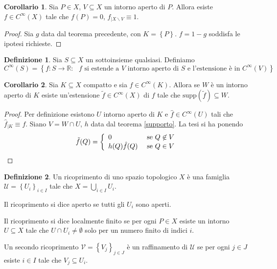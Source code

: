 \documentclass[a4paper,11pt]{article}
\theoremstyle{definition}
\newtheorem{definizione}{Definizione}[section]
\theoremstyle{theorem}
\newtheorem{corollario}{Corollario}[teorema]
\begin{document}
\begin{corollario}
	\label{supporto2}
	Sia $P\in X$, $V\subseteq X$ un intorno aperto di $P$. Allora esiste $f\in C^\infty(X)$ tale che $f(P)=0$, $f_{|X\backslash V}\equiv 1$.
\end{corollario}
\begin{proof}
	Sia $g$ data dal teorema precedente, con $K=\left\{P\right\}$. $f=1-g$ soddisfa le ipotesi richieste.
\end{proof}
\begin{definizione}
	Sia $S\subseteq X$ un sottoinsieme qualsiasi. Definiamo
	\[C^\infty(S)=\left\{f\colon S\to\mathbb{R}:\textrm{ $f$ si estende a $V$ intorno aperto di $S$ e l'estensione è in $C^\infty(V)$}\right\}\]
\end{definizione}
\begin{corollario}
	Sia $K\subseteq X$ compatto e sia $f\in C^\infty(K)$. Allora se $W$ è un intorno aperto di $K$ esiste un'estensione $\tilde{f}\in C^\infty(X)$ di $f$ tale che $\textrm{supp}(\tilde{f})\subseteq W$.
\end{corollario}
\begin{proof}
	Per definizione esistono $U$ intorno aperto di $K$ e $\hat{f}\in C^\infty(U)$ tali che $\hat{f}_{|K}\equiv f$. Siano $V=W\cap U$, $h$ data dal teorema \ref{supporto}. La tesi si ha ponendo 
	\[\tilde{f}(Q)=\left\{\begin{array}{l l}
	0 &\textrm{ se $Q\not\in V$}\\
	h(Q)\hat{f}(Q) &\textrm{ se $Q\in V$}
	\end{array}\right.\]
\end{proof}
\begin{definizione}
	Un ricoprimento di uno spazio topologico $X$ è una famiglia $\mathcal{U}=\left\{U_i\right\}_{i\in I}$ tale che $X=\bigcup_{i\in I}U_i$.
	
	Il ricoprimento si dice aperto se tutti gli $U_i$ sono aperti.
	
	Il ricoprimento si dice localmente finito se per ogni $P\in X$ esiste un intorno $U\subseteq X$ tale che $U\cap U_i\neq\emptyset$ solo per un numero finito di indici $i$.
	
	Un secondo ricoprimento $\mathcal{V}=\left\{V_j\right\}_{j\in J}$ è un raffinamento di $\mathcal{U}$ se per ogni $j\in J$ esiste $i\in I$ tale che $V_j\subseteq U_i$.
\end{definizione}
\end{document}

